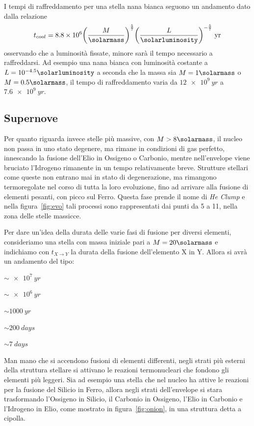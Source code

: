 I tempi di raffreddamento per una stella nana bianca seguono un andamento dato dalla relazione
\begin{equation}
    t_{cool} = 8.8\times 10^6 {\left(\frac{M}{\si{\solarmass}} \right)}^{\frac{5}{7}} {\left( \frac{L}{\si{\solarluminosity}} \right)}^{-\frac{5}{7}} \mbox{ yr}
\end{equation}
osservando che a luminosità fissate, minore sarà il tempo necessario a raffreddarsi. Ad esempio una nana bianca con luminosità costante a $L = 10^{-4.5} \si{\solarluminosity}$ a seconda che la massa sia $M = 1\si{\solarmass}$ o $M = 0.5 \si{\solarmass}$, il tempo di raffreddamento varia da $\SI{12e9}{yr}$ a $\SI{7.6e9}{yr}$.

\subsection{Supernove}\label{sec:supernove}
Per quanto riguarda invece stelle più massive, con $M > 8 \si{\solarmass}$, il nucleo non passa in uno stato degenere, ma rimane in condizioni di gas perfetto, innescando la fusione dell'Elio in Ossigeno o Carbonio, mentre nell'envelope viene bruciato l'Idrogeno rimanente in un tempo relativamente breve. Strutture stellari come queste non entrano mai in stato di degenerazione, ma rimangono termoregolate nel corso di tutta la loro evoluzione, fino ad arrivare alla fusione di elementi pesanti, con picco sul Ferro. Questa fase prende il nome di \textit{He Clump} e nella figura~\ref{fig:evo} tali processi sono rappresentati dai punti da 5 a 11, nella zona delle stelle massicce.

Per dare un'idea della durata delle varie fasi di fusione per diversi elementi, consideriamo una stella con massa iniziale pari a $M = 20\si{\solarmass}$ e indichiamo con $t_{X \rightarrow Y}$ la durata della fusione dell'elemento X in Y. Allora si avrà un andamento del tipo:
\begin{description}
    \centering
    \item[$t_{H \rightarrow He}$] $\sim \SI{e7}{yr}$
    \item[$t_{He \rightarrow C}$] $\sim \SI{e6}{yr}$
    \item[$t_{C \rightarrow O}$] $\sim \SI{1000}{yr}$
    \item[$t_{O}$] $\sim \SI{200}{days}$
    \item[$t_{Si}$] $\sim \SI{7}{days}$
\end{description}

Man mano che si accendono fusioni di elementi differenti, negli strati più esterni della struttura stellare si attivano le reazioni termonucleari che fondono gli elementi più leggeri. Sia ad esempio una stella che nel nucleo ha attive le reazioni per la fusione del Silicio in Ferro, allora negli strati dell'envelope si stara trasformando l'Ossigeno in Silicio, il Carbonio in Ossigeno, l'Elio in Carbonio e l'Idrogeno in Elio, come mostrato in figura~\ref{fig:onion}, in una struttura detta a cipolla.

